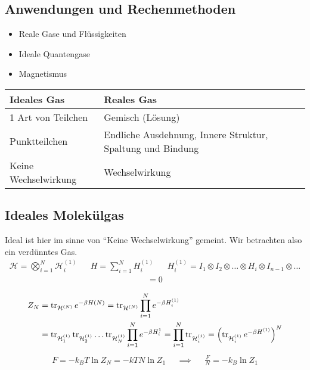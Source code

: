 \subsection*{Anwendungen und Rechenmethoden}

\begin{itemize}
    \item Reale Gase und Fl\"ussigkeiten
    \item Ideale Quantengase
    \item Magnetismus
\end{itemize}
\begin{table}[h!]
    \centering
    \begin{tabular}{p{5cm} | p{5cm}}
        Ideales Gas & Reales Gas \\
        \hline
        1 Art von Teilchen & Gemisch (L\"osung) \\
        Punktteilchen & Endliche Ausdehnung, Innere Struktur, Spaltung und Bindung \\
        Keine Wechselwirkung & Wechselwirkung \\
    \end{tabular}
\end{table}
\subsection*{Ideales Molek\"ulgas}
Ideal ist hier im sinne von ``Keine Wechselwirkung'' gemeint. Wir betrachten 
also ein verd\"unntes Gas.
%
\begin{align*}
    \mathcal{H} = \bigotimes_{i=1}^{N} \mathcal{H}_i^{(1)} &&
    H = \sum_{i=1}^{N} H_i^{(1)} && H_i^{(1)} = 
    I_1 \otimes I_2 \otimes \ldots \otimes H_i \otimes I_{n-1} \otimes \ldots 
\end{align*}
%
%
\begin{align*}
    [H_i^{(1)} , H_i^{(1)}]  = 0
\end{align*}
%

%
\begin{align*}
    Z_N & = \operatorname{tr}_{\mathcal{H}^{(N)}} e ^{-\beta H(N)} = 
    \operatorname{tr}_{\mathcal{H}^{(N)}} \prod_{i=1}^{N} e ^{-\beta H_i^{(1)}} \\
    & = \operatorname{tr}_{\mathcal{H}_1^{(1)}}\operatorname{tr}_{\mathcal{H}_2^{(1)}} \ldots \operatorname{tr}_{\mathcal{H}_N^{(1)}} 
    \prod_{i=1}^{N} e^{-\beta H^{1}_i} = \prod_{i=1}^{N} \operatorname{tr}_{\mathcal{H}_i^{(1)}} = 
    \left( \operatorname{tr}_{\mathcal{H}_i^{(1)}} e ^{-\beta H^{(1)}} \right)^{N}
\end{align*}
%
%
\begin{align*}
    F = -k_B T \ln{Z_N} = - k T N \ln{Z_1} && \implies &&  
    \frac{F}{N} = - k_B \ln{Z_1}
\end{align*}
%
